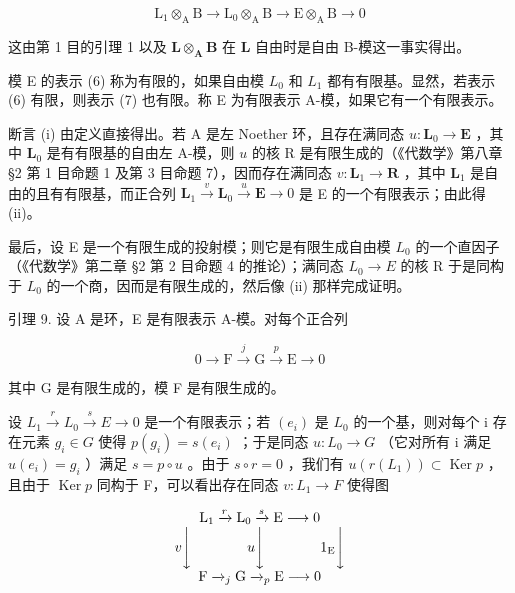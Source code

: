 \[
\mathrm{L} _ {1} \otimes_ {\mathrm{A}} \mathrm{B} \rightarrow \mathrm{L} _ {0} \otimes_ {\mathrm{A}} \mathrm{B} \rightarrow \mathrm{E} \otimes_ {\mathrm{A}} \mathrm{B} \rightarrow 0\tag{7}
\]

这由第 1 目的引理 1 以及 \(\mathbf{L} \otimes_{\mathbf{A}} \mathbf{B}\) 在 \(\mathbf{L}\) 自由时是自由 B-模这一事实得出。

模 E 的表示 (6) 称为有限的，如果自由模 \(L_{0}\) 和 \(L_{1}\) 都有有限基。显然，若表示 (6) 有限，则表示 (7) 也有限。称 E 为有限表示 A-模，如果它有一个有限表示。

断言 (i) 由定义直接得出。若 A 是左 Noether 环，且存在满同态 \(u \colon \mathbf{L}_0 \to \mathbf{E}\) ，其中 \(\mathbf{L}_0\) 是有有限基的自由左 A-模，则 \(u\) 的核 R 是有限生成的（《代数学》第八章 §2 第 1 目命题 1 及第 3 目命题 7），因而存在满同态 \(v \colon \mathbf{L}_1 \to \mathbf{R}\) ，其中 \(\mathbf{L}_1\) 是自由的且有有限基，而正合列 \(\mathbf{L}_1 \xrightarrow{v} \mathbf{L}_0 \xrightarrow{u} \mathbf{E} \to 0\) 是 E 的一个有限表示；由此得 (ii)。

最后，设 E 是一个有限生成的投射模；则它是有限生成自由模 \(L_{0}\) 的一个直因子（《代数学》第二章 §2 第 2 目命题 4 的推论）；满同态 \(L_{0} \rightarrow E\) 的核 R 于是同构于 \(L_{0}\) 的一个商，因而是有限生成的，然后像 (ii) 那样完成证明。

引理 9. 设 A 是环，E 是有限表示 A-模。对每个正合列

\[
0 \longrightarrow \mathrm{F} \stackrel {j} {\longrightarrow} \mathrm{G} \stackrel {p} {\longrightarrow} \mathrm{E} \longrightarrow 0
\]

其中 G 是有限生成的，模 F 是有限生成的。

设 \(L_{1} \stackrel{r}{\rightarrow} L_{0} \stackrel{s}{\rightarrow} E \rightarrow 0\) 是一个有限表示；若 \((e_{i})\) 是 \(L_{0}\) 的一个基，则对每个 i 存在元素 \(g_{i} \in G\) 使得 \(p(g_{i}) = s(e_{i})\) ；于是同态 \(u: L_{0} \rightarrow G\) （它对所有 i 满足 \(u(e_{i}) = g_{i}\) ）满足 \(s = p \circ u\) 。由于 \(s \circ r = 0\) ，我们有 \(u(r(L_{1})) \subset \operatorname{Ker} p\) ，且由于 \(\operatorname{Ker} p\) 同构于 F，可以看出存在同态 \(v: L_{1} \rightarrow F\) 使得图

\[
\begin{array}{c} \mathrm{L} _ {1} \xrightarrow {r} \mathrm{L} _ {0} \xrightarrow {s} \mathrm{E} \longrightarrow 0 \\ v \Biggl \downarrow \qquad \qquad u \Biggl \downarrow \qquad \qquad 1 _ {\mathrm{E}} \Biggl \downarrow \\ \mathrm{F} \xrightarrow {} _ {j} \mathrm{G} \xrightarrow {} _ {p} \mathrm{E} \longrightarrow 0 \end{array}
\]

